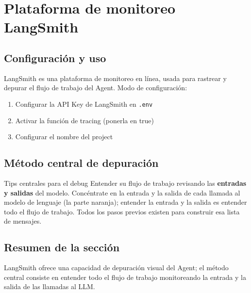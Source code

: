 \section{Plataforma de monitoreo LangSmith}

\subsection{Configuración y uso}

LangSmith es una plataforma de monitoreo en línea, usada para rastrear y depurar el flujo de trabajo del Agent. Modo de configuración:
\begin{enumerate}
    \item Configurar la API Key de LangSmith en \texttt{.env}
    \item Activar la función de tracing (ponerla en true)
    \item Configurar el nombre del project
\end{enumerate}

\subsection{Método central de depuración}

\begin{importantbox}{Tips centrales para el debug}
Entender su flujo de trabajo revisando las \textbf{entradas y salidas} del modelo. Concéntrate en la entrada y la salida de cada llamada al modelo de lenguaje (la parte naranja); entender la entrada y la salida es entender todo el flujo de trabajo. Todos los pasos previos existen para construir esa lista de mensajes.
\end{importantbox}

\subsection{Resumen de la sección}
LangSmith ofrece una capacidad de depuración visual del Agent; el método central consiste en entender todo el flujo de trabajo monitoreando la entrada y la salida de las llamadas al LLM.

